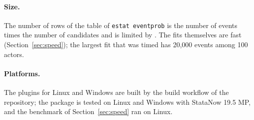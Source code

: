 \paragraph{Size.} The number of rows of the table of \texttt{estat eventprob} is the number of events times the number of candidates and is limited by . The fits themselves are fast (Section~\ref{sec:speed}); the largest fit that was timed has 20,000 events among 100 actors.

\paragraph{Platforms.} The plugins for Linux and Windows are built by the build workflow of the repository; the package is tested on Linux and Windows with StataNow 19.5 MP, and the benchmark of Section~\ref{sec:speed} ran on Linux.

